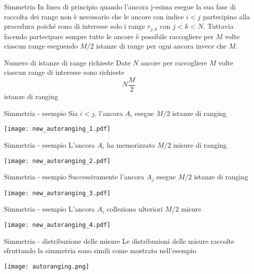 \begin{frame}{Simmetria}
  In linea di principio quando l'ancora j-esima esegue la sua fase di raccolta dei range non è
  necessario che le ancore con indice $i < j$ partecipino alla procedura poiché sono di interesse solo
  i range $r_{j,k}$ con $j < k < N$. Tuttavia facendo partecipare sempre tutte le ancore è possibile
  raccogliere per $M$ volte ciascun range eseguendo $M/2$ istanze di range per ogni ancora invece che $M$.

  \begin{exampleblock}{Numero di istanze di range richieste}
    Date $N$ ancore per raccogliere $M$ volte ciascun range di interesse sono richieste
    \[
    N \frac{M}{2}
    \]
    istanze di ranging
  \end{exampleblock}
\end{frame}

\begin{frame}{Simmetria - esempio}
  Sia $i<j$, l'ancora $A_i$ esegue $M/2$ istanze di ranging
  \begin{center}
    \texttt{[image: new\_autoranging\_1.pdf]}
  \end{center}
\end{frame}

\begin{frame}{Simmetria - esempio}
  L'ancora $A_i$ ha memorizzato $M/2$ misure di ranging
  \begin{center}
    \texttt{[image: new\_autoranging\_2.pdf]}
  \end{center}
\end{frame}

\begin{frame}{Simmetria - esempio}
  Successivamente l'ancora $A_j$ esegue $M/2$ istanze di ranging
  \begin{center}
    \texttt{[image: new\_autoranging\_3.pdf]}
  \end{center}
\end{frame}

\begin{frame}{Simmetria - esempio}
  L'ancora $A_i$ colleziona ulteriori $M/2$ misure
  \begin{center}
    \texttt{[image: new\_autoranging\_4.pdf]}
  \end{center}
\end{frame}

\begin{frame}{Simmetria - distribuzione delle misure}
  Le distribuzioni delle misure raccolte sfruttando la simmetria sono simili come mostrato nell'esempio 
  \begin{center}
    \texttt{[image: autoranging.png]}
  \end{center}
\end{frame}

